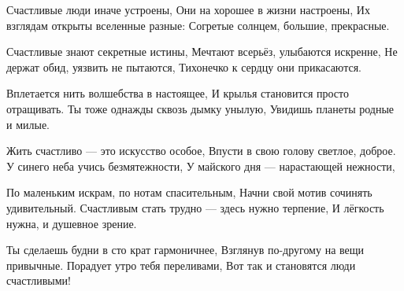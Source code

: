 Счастливые люди иначе устроены,
Они на хорошее в жизни настроены,
Их взглядам открыты вселенные разные:
Согретые солнцем, большие, прекрасные.

Счастливые знают секретные истины,
Мечтают всерьёз, улыбаются искренне,
Не держат обид, уязвить не пытаются,
Тихонечко к сердцу они прикасаются.

Вплетается нить волшебства в настоящее,
И крылья становится просто отращивать.
Ты тоже однажды сквозь дымку унылую,
Увидишь планеты родные и милые.

Жить счастливо --- это искусство особое,
Впусти в свою голову светлое, доброе.
У синего неба учись безмятежности,
У майского дня --- нарастающей нежности,

По маленьким искрам, по нотам спасительным,
Начни свой мотив сочинять удивительный.
Счастливым стать трудно --- здесь нужно терпение,
И лёгкость нужна, и душевное зрение.

Ты сделаешь будни в сто крат гармоничнее,
Взглянув по-другому на вещи привычные.
Порадует утро тебя переливами,
Вот так и становятся люди счастливыми!
